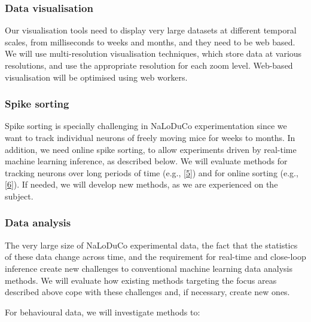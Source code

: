 \subsubsection{Data visualisation}

Our visualisation tools need to display very large datasets at different
temporal scales, from milliseconds to weeks and months, and they need to be web
based.
%
We will use multi-resolution visualisation techniques, which store data at
various resolutions, and use the appropriate resolution for each zoom level.
%
Web-based visualisation will be optimised using web workers.

\subsubsection{Spike sorting}

Spike sorting is specially challenging in NaLoDuCo experimentation since we
want to track individual neurons of freely moving mice for weeks to months.
%
In addition, we need online spike sorting, to allow experiments driven
by real-time machine learning inference, as described below.
%
We will evaluate methods for tracking neurons over long periods of time
(e.g., [\href{https://pubmed.ncbi.nlm.nih.gov/38985568/}{5}]) and for online sorting
(e.g., [\href{https://pubmed.ncbi.nlm.nih.gov/16488479/}{6}]). If needed, we will develop
new methods, as we are experienced on the subject.

\subsubsection{Data analysis}

The very large size of NaLoDuCo experimental data, the fact that the statistics
of these data change across time, and the requirement for real-time and
close-loop inference create new challenges to conventional machine learning
data analysis methods.
%
We will evaluate how existing methods targeting the focus areas described above
cope with these challenges and, if necessary, create new ones.

For behavioural data, we will investigate methods to:

